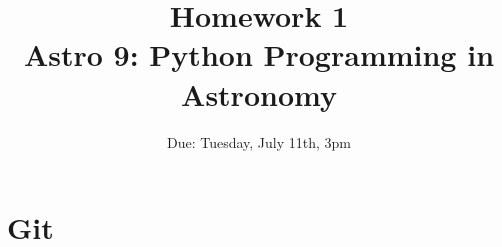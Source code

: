 \documentclass[noanswers]{tufte-handout}
\title{Homework 1 \\
\Large{Astro 9: Python Programming in Astronomy}}
\date{Due: Tuesday, July 11th, 3pm}
\begin{document}
\maketitle %

\section{Git}
\end{document}
